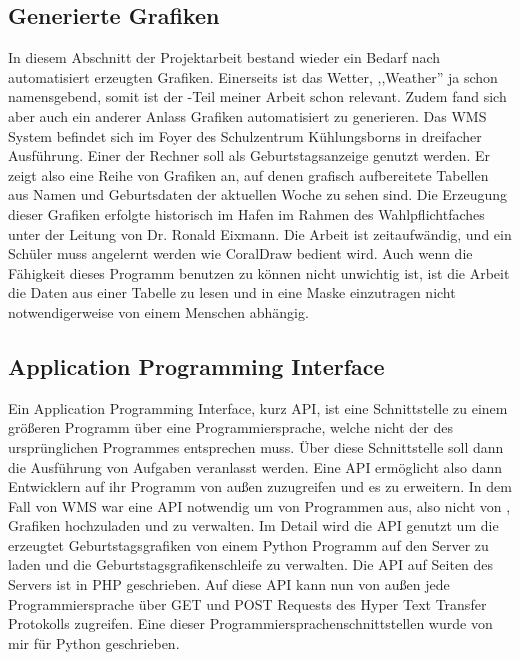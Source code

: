 \subsection{Generierte Grafiken}
\label{sub:Generierte Grafiken}
In diesem Abschnitt der Projektarbeit bestand wieder ein Bedarf nach automatisiert erzeugten Grafiken.
Einerseits ist das Wetter, ,,Weather'' ja schon namensgebend, somit ist der \vs -Teil meiner Arbeit schon relevant.
Zudem fand sich aber auch ein anderer Anlass Grafiken automatisiert zu generieren.
Das WMS System befindet sich im Foyer des Schulzentrum Kühlungsborns in dreifacher Ausführung.
Einer der Rechner soll als Geburtstagsanzeige genutzt werden.
Er zeigt also eine Reihe von Grafiken an, auf denen grafisch aufbereitete Tabellen aus Namen und Geburtsdaten der aktuellen Woche zu sehen sind.
Die Erzeugung dieser Grafiken erfolgte historisch im Hafen im Rahmen des Wahlpflichtfaches unter der Leitung von Dr. Ronald Eixmann.
Die Arbeit ist zeitaufwändig, und ein Schüler muss angelernt werden wie CoralDraw bedient wird.
Auch wenn die Fähigkeit dieses Programm benutzen zu können nicht unwichtig ist, ist die Arbeit die
Daten aus einer Tabelle zu lesen und in eine Maske einzutragen nicht notwendigerweise von einem Menschen abhängig.\\

\subsection{Application Programming Interface}
\label{sub:wmsapi}
Ein Application Programming Interface, kurz API, ist eine Schnittstelle zu einem größeren Programm
über eine Programmiersprache, welche nicht der des ursprünglichen Programmes entsprechen muss.
Über diese Schnittstelle soll dann die Ausführung von Aufgaben veranlasst werden.
Eine API ermöglicht also dann Entwicklern auf ihr Programm von außen zuzugreifen und es zu erweitern.
In dem Fall von WMS war eine API notwendig um von Programmen aus,
also nicht von , Grafiken hochzuladen und zu verwalten.
Im Detail wird die API genutzt um die erzeugtet Geburtstagsgrafiken von einem Python Programm auf den Server zu laden und die Geburtstagsgrafikenschleife zu verwalten.
Die API auf Seiten des Servers ist in PHP geschrieben.
Auf diese API kann nun von außen jede Programmiersprache über GET und POST Requests des Hyper Text Transfer Protokolls zugreifen.
Eine dieser Programmiersprachenschnittstellen wurde von mir für Python geschrieben.

